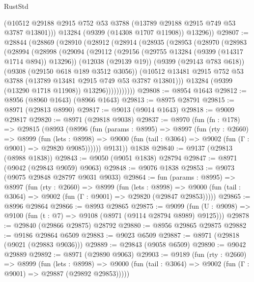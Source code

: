 \begin{lexlean}{RustStd}
\begin{coremodule}
          (@10512 @29188 @2915 @752 @53 @3788 (@13789 @29188 @2915 @749 @53 @3787 @13801)))
        @13284
        (@9399 (@14308 @1707 @11908))
        @13296))
@29807 := @28844
    (@28869
      (@28910
        (@28912
          (@28914
            (@28935
              (@28953
                (@28970
                  (@28983
                    (@28994
                      (@28998
                        (@29094
                          (@29112
                            (@29156 (@29755 @13284 (@9399 (@14317 @1714 @894)) @13296))
                            (@12038 (@29139 @19))
                            (@9399 (@29143 @783 @618))
                            (@9308 (@29150 @618 @189 @3512 @3056))
                            (@10512
                              @13481
                              @2915
                              @752
                              @53
                              @3788
                              (@13789 @13481 @2915 @749 @53 @3787 @13801)))
                          @13284
                          (@9399 (@13290 @1718 @11908))
                          @13296)))))))))))
@29808 := @8954 @1643
@29812 := @8956 (@8960 @1643) (@8966 @1643)
@29813 := @8975 @28791
@29815 := @8971 (@29813 @8990)
@29817 := @9013 (@9014 @1643)
@29818 := @9009 @29817
@29820 := @8971 (@29818 @9038)
@29837 := @8970
    (fun (fn : @178) =>
    @29815
      (@8993
        (@8996
          (fun (params : @8995) =>
          @8997
            (fun (rty : @2660) =>
            @8999
              (fun (lets : @8998) =>
              @9000 (fun (tail : @3064) => @9002 (fun (Γ : @9001) => @29820 @9085))))))
        @9131))
    @1838
@29840 := @9137 (@29813 (@8988 @1838))
@29843 := @9050 (@9051 @1838) @28794
@29847 := @8971 (@9042 (@29843 @9059) @9063)
@29848 := @9076 @1838
@29853 := @9073 (@9075 @29848 @28797 @9031 @9033)
@29864 := fun (params : @8995) =>
  @8997
    (fun (rty : @2660) =>
    @8999
      (fun (lets : @8998) =>
      @9000 (fun (tail : @3064) => @9002 (fun (Γ : @9001) => @29820 (@29847 @29853)))))
@29865 := @8996 @29864
@29866 := @8993 @29865
@29875 := @9099
    (fun (U : @9098) => @9100 (fun (t : @7) => @9108 (@8971 (@9114 @28794 @8989) @9125)))
@29878 := @29840 (@29866 @29875) @28792
@29880 := @8956 @29865 @29875
@29882 := @9186 @29864 @6509
@29883 := @9023 @6509
@29887 := @8971 (@29818 (@9021 (@29883 @9036)))
@29889 := @29843 (@9058 @6509)
@29890 := @9042 @29889
@29892 := @8971 (@29890 @9063)
@29903 := @9189
    (fun (rty : @2660) =>
    @8999
      (fun (lets : @8998) =>
      @9000 (fun (tail : @3064) => @9002 (fun (Γ : @9001) => @29887 (@29892 @29853)))))

\end{coremodule}
\end{lexlean}
